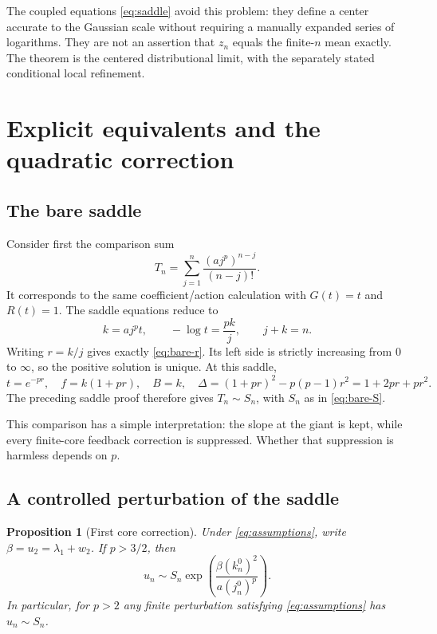 \documentclass[11pt,a4paper]{article}
\numberwithin{equation}{section}
\newtheorem{proposition}[theorem]{Proposition}
\theoremstyle{definition}
\theoremstyle{remark}
\begin{document}
The coupled equations \eqref{eq:saddle} avoid this problem: they define a
center accurate to the Gaussian scale without requiring a manually expanded
series of logarithms. They are not an assertion that $z_n$ equals the
finite-$n$ mean exactly. The theorem is the centered distributional limit,
with the separately stated conditional local refinement.

\section{Explicit equivalents and the quadratic correction}
\label{sec:explicit}

\subsection{The bare saddle}

Consider first the comparison sum
\begin{equation}
 T_n=\sum_{j=1}^n\frac{(a j^p)^{n-j}}{(n-j)!}.
 \label{eq:bare-sum}
\end{equation}
It corresponds to the same coefficient/action calculation with $G(t)=t$
and $R(t)=1$. The saddle equations reduce to
\[
 k=a j^pt,\qquad-\log t=\frac{pk}{j},\qquad j+k=n.
\]
Writing $r=k/j$ gives exactly \eqref{eq:bare-r}. Its left side is
strictly increasing from $0$ to $\infty$, so the positive solution is
unique. At this saddle,
\[
 t=e^{-pr},\quad f=k(1+pr),\quad
 B=k,\quad\Delta=(1+pr)^2-p(p-1)r^2
                  =1+2pr+pr^2.
\]
The preceding saddle proof therefore gives $T_n\sim S_n$, with $S_n$
as in \eqref{eq:bare-S}.

This comparison has a simple interpretation: the slope at the giant is
kept, while every finite-core feedback correction is suppressed. Whether
that suppression is harmless depends on $p$.

\subsection{A controlled perturbation of the saddle}

\begin{proposition}[First core correction]
\label{prop:first-correction}
Under \eqref{eq:assumptions}, write
$\beta=u_2=\lambda_1+w_2$. If $p>3/2$, then
\begin{equation}
 u_n\sim S_n\exp\!\left(\frac{\beta(k_n^0)^2}{a(j_n^0)^p}\right).
 \label{eq:general-first-correction}
\end{equation}
In particular, for $p>2$ any finite perturbation satisfying
\eqref{eq:assumptions} has $u_n\sim S_n$.
\end{proposition}
\end{document}
